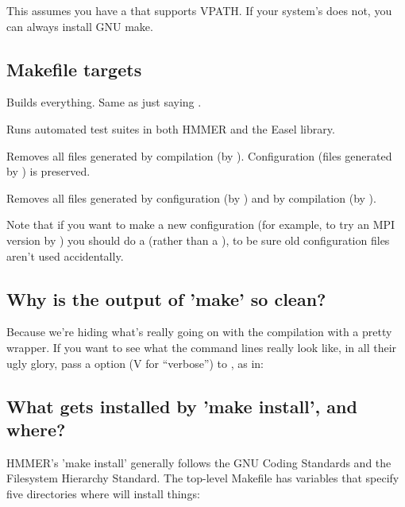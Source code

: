 This assumes you have a  that supports VPATH. If your
system's  does not, you can always install GNU make.

\subsection{Makefile targets}

\begin{sreitems}{}

\item[\emprog{all}]
  Builds everything. Same as just saying .

\item[\emprog{check}]
  Runs automated test suites in both HMMER and the Easel library.

\item[\emprog{clean}]
  Removes all files generated by compilation (by
  ). Configuration (files generated by
  ) is preserved.

\item[\emprog{distclean}]
  Removes all files generated by configuration (by )
  and by compilation (by ). 

  Note that if you want to make a new configuration (for example, to
  try an MPI version by ) you
  should do a  (rather than a ), to be sure old configuration files aren't used
  accidentally.
\end{sreitems}

\subsection{Why is the output of 'make' so clean?}

Because we're hiding what's really going on with the compilation with
a pretty wrapper.  If you want to see what the command lines really
look like, in all their ugly glory, pass a  option (V for
``verbose'') to , as in:


\subsection{What gets installed by 'make install', and where?}

HMMER's 'make install' generally follows the GNU Coding Standards and
the Filesystem Hierarchy Standard. The top-level Makefile has
variables that specify five directories where 
will install things:

